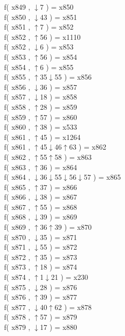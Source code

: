 f( x849 , $\downarrow$7 ) = x850 \\
f( x850 , $\downarrow$43 ) = x851 \\
f( x851 , $\uparrow$7 ) = x852 \\
f( x852 , $\uparrow$56 ) = x1110 \\
f( x852 , $\downarrow$6 ) = x853 \\
f( x853 , $\uparrow$56 ) = x854 \\
f( x854 , $\uparrow$6 ) = x855 \\
f( x855 , $\uparrow$35$\downarrow$55 ) = x856 \\
f( x856 , $\downarrow$36 ) = x857 \\
f( x857 , $\downarrow$18 ) = x858 \\
f( x858 , $\uparrow$28 ) = x859 \\
f( x859 , $\uparrow$57 ) = x860 \\
f( x860 , $\uparrow$38 ) = x533 \\
f( x861 , $\uparrow$45 ) = x1264 \\
f( x861 , $\uparrow$45$\downarrow$46$\uparrow$63 ) = x862 \\
f( x862 , $\uparrow$55$\uparrow$58 ) = x863 \\
f( x863 , $\uparrow$36 ) = x864 \\
f( x864 , $\downarrow$36$\downarrow$55$\downarrow$56$\downarrow$57 ) = x865 \\
f( x865 , $\uparrow$37 ) = x866 \\
f( x866 , $\downarrow$38 ) = x867 \\
f( x867 , $\uparrow$55 ) = x868 \\
f( x868 , $\downarrow$39 ) = x869 \\
f( x869 , $\uparrow$36$\uparrow$39 ) = x870 \\
f( x870 , $\downarrow$35 ) = x871 \\
f( x871 , $\downarrow$55 ) = x872 \\
f( x872 , $\uparrow$35 ) = x873 \\
f( x873 , $\uparrow$18 ) = x874 \\
f( x874 , $\uparrow$1$\downarrow$21 ) = x230 \\
f( x875 , $\downarrow$28 ) = x876 \\
f( x876 , $\uparrow$39 ) = x877 \\
f( x877 , $\downarrow$40$\uparrow$62 ) = x878 \\
f( x878 , $\uparrow$57 ) = x879 \\
f( x879 , $\downarrow$17 ) = x880 \\
